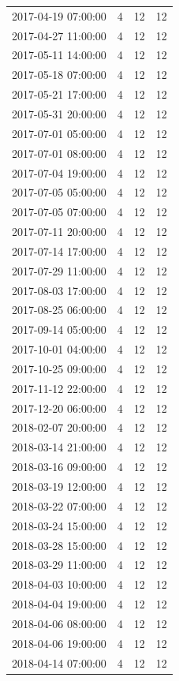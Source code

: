 \begin{tabular}{lrrr}
2017-04-19 07:00:00 & 4 & 12 & 12 \\
2017-04-27 11:00:00 & 4 & 12 & 12 \\
2017-05-11 14:00:00 & 4 & 12 & 12 \\
2017-05-18 07:00:00 & 4 & 12 & 12 \\
2017-05-21 17:00:00 & 4 & 12 & 12 \\
2017-05-31 20:00:00 & 4 & 12 & 12 \\
2017-07-01 05:00:00 & 4 & 12 & 12 \\
2017-07-01 08:00:00 & 4 & 12 & 12 \\
2017-07-04 19:00:00 & 4 & 12 & 12 \\
2017-07-05 05:00:00 & 4 & 12 & 12 \\
2017-07-05 07:00:00 & 4 & 12 & 12 \\
2017-07-11 20:00:00 & 4 & 12 & 12 \\
2017-07-14 17:00:00 & 4 & 12 & 12 \\
2017-07-29 11:00:00 & 4 & 12 & 12 \\
2017-08-03 17:00:00 & 4 & 12 & 12 \\
2017-08-25 06:00:00 & 4 & 12 & 12 \\
2017-09-14 05:00:00 & 4 & 12 & 12 \\
2017-10-01 04:00:00 & 4 & 12 & 12 \\
2017-10-25 09:00:00 & 4 & 12 & 12 \\
2017-11-12 22:00:00 & 4 & 12 & 12 \\
2017-12-20 06:00:00 & 4 & 12 & 12 \\
2018-02-07 20:00:00 & 4 & 12 & 12 \\
2018-03-14 21:00:00 & 4 & 12 & 12 \\
2018-03-16 09:00:00 & 4 & 12 & 12 \\
2018-03-19 12:00:00 & 4 & 12 & 12 \\
2018-03-22 07:00:00 & 4 & 12 & 12 \\
2018-03-24 15:00:00 & 4 & 12 & 12 \\
2018-03-28 15:00:00 & 4 & 12 & 12 \\
2018-03-29 11:00:00 & 4 & 12 & 12 \\
2018-04-03 10:00:00 & 4 & 12 & 12 \\
2018-04-04 19:00:00 & 4 & 12 & 12 \\
2018-04-06 08:00:00 & 4 & 12 & 12 \\
2018-04-06 19:00:00 & 4 & 12 & 12 \\
2018-04-14 07:00:00 & 4 & 12 & 12 \\

\end{tabular}
